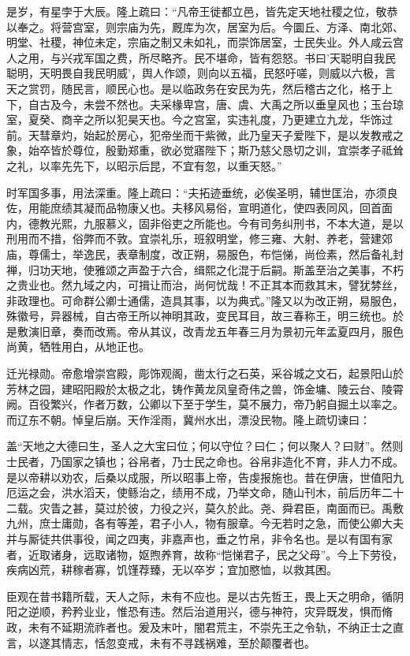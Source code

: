 \documentclass[12pt,UTF8]{ctexbook}
\begin{document}
是岁，有星孛于大辰。隆上疏曰：“凡帝王徙都立邑，皆先定天地社稷之位，敬恭以奉之。将营宫室，则宗庙为先，厩库为次，居室为后。今圜丘、方泽、南北郊、明堂、社稷，神位未定，宗庙之制又未如礼，而崇饰居室，士民失业。外人咸云宫人之用，与兴戎军国之费，所尽略齐。民不堪命，皆有怨怒。书曰'天聪明自我民聪明，天明畏自我民明威'，舆人作颂，则向以五福，民怒吁嗟，则威以六极，言天之赏罚，随民言，顺民心也。是以临政务在安民为先，然后稽古之化，格于上下，自古及今，未尝不然也。夫采椽卑宫，唐、虞、大禹之所以垂皇风也；玉台琼室，夏癸、商辛之所以犯昊天也。今之宫室，实违礼度，乃更建立九龙，华饰过前。天彗章灼，始起於房心，犯帝坐而干紫微，此乃皇天子爱陛下，是以发教戒之象，始卒皆於尊位，殷勤郑重，欲必觉寤陛下；斯乃慈父恳切之训，宜崇孝子祗耸之礼，以率先先下，以昭示后昆，不宜有忽，以重天怒。”

时军国多事，用法深重。隆上疏曰：“夫拓迹垂统，必俟圣明，辅世匡治，亦须良佐，用能庶绩其凝而品物康乂也。夫移风易俗，宣明道化，使四表同风，回首面内，德教光熙，九服慕义，固非俗吏之所能也。今有司务纠刑书，不本大道，是以刑用而不措，俗弊而不敦。宜崇礼乐，班叙明堂，修三雍、大射、养老，营建郊庙，尊儒士，举逸民，表章制度，改正朔，易服色，布恺悌，尚俭素，然后备礼封禅，归功天地，使雅颂之声盈于六合，缉熙之化混于后嗣。斯盖至治之美事，不朽之贵业也。然九域之内，可揖让而治，尚何忧哉！不正其本而救其末，譬犹棼丝，非政理也。可命群公卿士通儒，造具其事，以为典式。”隆又以为改正朔，易服色，殊徽号，异器械，自古帝王所以神明其政，变民耳目，故三春称王，明三统也。於是敷演旧章，奏而改焉。帝从其议，改青龙五年春三月为景初元年孟夏四月，服色尚黄，牺牲用白，从地正也。

迁光禄勋。帝愈增崇宫殿，彫饰观阁，凿太行之石英，采谷城之文石，起景阳山於芳林之园，建昭阳殿於太极之北，铸作黄龙凤皇奇伟之兽，饰金墉、陵云台、陵霄阙。百役繁兴，作者万数，公卿以下至于学生，莫不展力，帝乃躬自掘土以率之。而辽东不朝。悼皇后崩。天作淫雨，冀州水出，漂没民物。隆上疏切谏曰：

盖“天地之大德曰生，圣人之大宝曰位；何以守位？曰仁；何以聚人？曰财”。然则士民者，乃国家之镇也；谷帛者，乃士民之命也。谷帛非造化不育，非人力不成。是以帝耕以劝农，后桑以成服，所以昭事上帝，告虔报施也。昔在伊唐，世值阳九厄运之会，洪水滔天，使鲧治之，绩用不成，乃举文命，随山刊木，前后历年二十二载。灾眚之甚，莫过於彼，力役之兴，莫久於此。尧、舜君臣，南面而已。禹敷九州，庶士庸勋，各有等差，君子小人，物有服章。今无若时之急，而使公卿大夫并与厮徒共供事役，闻之四夷，非嘉声也，垂之竹帛，非令名也。是以有国有家者，近取诸身，远取诸物，妪煦养育，故称“恺悌君子，民之父母”。今上下劳役，疾病凶荒，耕稼者寡，饥馑荐臻，无以卒岁；宜加愍恤，以救其困。

臣观在昔书籍所载，天人之际，未有不应也。是以古先哲王，畏上天之明命，循阴阳之逆顺，矜矜业业，惟恐有违。然后治道用兴，德与神符，灾异既发，惧而脩政，未有不延期流祚者也。爰及末叶，闇君荒主，不崇先王之令轨，不纳正士之直言，以遂其情志，恬忽变戒，未有不寻践祸难，至於颠覆者也。
\end{document}
